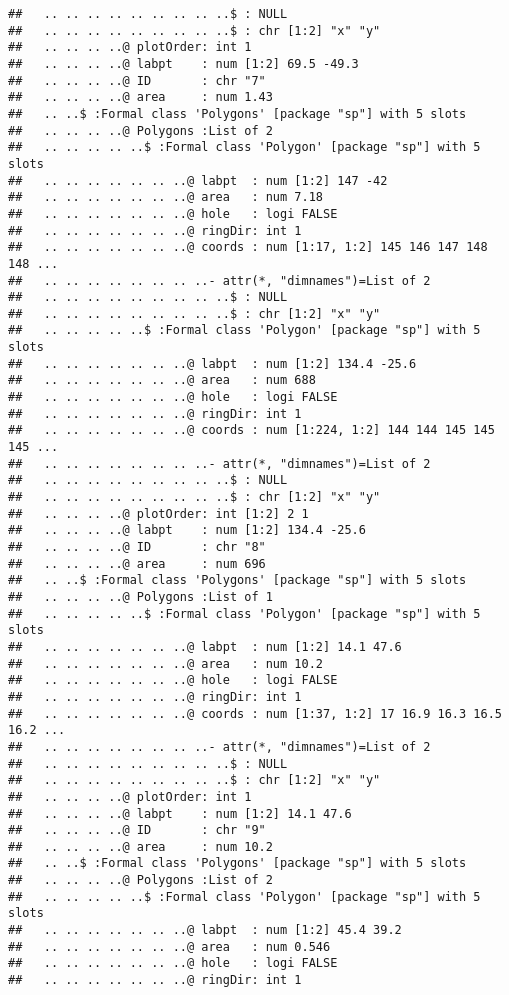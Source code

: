 \documentclass[]{article}
\begin{document}
\begin{verbatim}
##   .. .. .. .. .. .. .. .. ..$ : NULL
##   .. .. .. .. .. .. .. .. ..$ : chr [1:2] "x" "y"
##   .. .. .. ..@ plotOrder: int 1
##   .. .. .. ..@ labpt    : num [1:2] 69.5 -49.3
##   .. .. .. ..@ ID       : chr "7"
##   .. .. .. ..@ area     : num 1.43
##   .. ..$ :Formal class 'Polygons' [package "sp"] with 5 slots
##   .. .. .. ..@ Polygons :List of 2
##   .. .. .. .. ..$ :Formal class 'Polygon' [package "sp"] with 5 slots
##   .. .. .. .. .. .. ..@ labpt  : num [1:2] 147 -42
##   .. .. .. .. .. .. ..@ area   : num 7.18
##   .. .. .. .. .. .. ..@ hole   : logi FALSE
##   .. .. .. .. .. .. ..@ ringDir: int 1
##   .. .. .. .. .. .. ..@ coords : num [1:17, 1:2] 145 146 147 148 148 ...
##   .. .. .. .. .. .. .. ..- attr(*, "dimnames")=List of 2
##   .. .. .. .. .. .. .. .. ..$ : NULL
##   .. .. .. .. .. .. .. .. ..$ : chr [1:2] "x" "y"
##   .. .. .. .. ..$ :Formal class 'Polygon' [package "sp"] with 5 slots
##   .. .. .. .. .. .. ..@ labpt  : num [1:2] 134.4 -25.6
##   .. .. .. .. .. .. ..@ area   : num 688
##   .. .. .. .. .. .. ..@ hole   : logi FALSE
##   .. .. .. .. .. .. ..@ ringDir: int 1
##   .. .. .. .. .. .. ..@ coords : num [1:224, 1:2] 144 144 145 145 145 ...
##   .. .. .. .. .. .. .. ..- attr(*, "dimnames")=List of 2
##   .. .. .. .. .. .. .. .. ..$ : NULL
##   .. .. .. .. .. .. .. .. ..$ : chr [1:2] "x" "y"
##   .. .. .. ..@ plotOrder: int [1:2] 2 1
##   .. .. .. ..@ labpt    : num [1:2] 134.4 -25.6
##   .. .. .. ..@ ID       : chr "8"
##   .. .. .. ..@ area     : num 696
##   .. ..$ :Formal class 'Polygons' [package "sp"] with 5 slots
##   .. .. .. ..@ Polygons :List of 1
##   .. .. .. .. ..$ :Formal class 'Polygon' [package "sp"] with 5 slots
##   .. .. .. .. .. .. ..@ labpt  : num [1:2] 14.1 47.6
##   .. .. .. .. .. .. ..@ area   : num 10.2
##   .. .. .. .. .. .. ..@ hole   : logi FALSE
##   .. .. .. .. .. .. ..@ ringDir: int 1
##   .. .. .. .. .. .. ..@ coords : num [1:37, 1:2] 17 16.9 16.3 16.5 16.2 ...
##   .. .. .. .. .. .. .. ..- attr(*, "dimnames")=List of 2
##   .. .. .. .. .. .. .. .. ..$ : NULL
##   .. .. .. .. .. .. .. .. ..$ : chr [1:2] "x" "y"
##   .. .. .. ..@ plotOrder: int 1
##   .. .. .. ..@ labpt    : num [1:2] 14.1 47.6
##   .. .. .. ..@ ID       : chr "9"
##   .. .. .. ..@ area     : num 10.2
##   .. ..$ :Formal class 'Polygons' [package "sp"] with 5 slots
##   .. .. .. ..@ Polygons :List of 2
##   .. .. .. .. ..$ :Formal class 'Polygon' [package "sp"] with 5 slots
##   .. .. .. .. .. .. ..@ labpt  : num [1:2] 45.4 39.2
##   .. .. .. .. .. .. ..@ area   : num 0.546
##   .. .. .. .. .. .. ..@ hole   : logi FALSE
##   .. .. .. .. .. .. ..@ ringDir: int 1

\end{verbatim}
\end{document}
